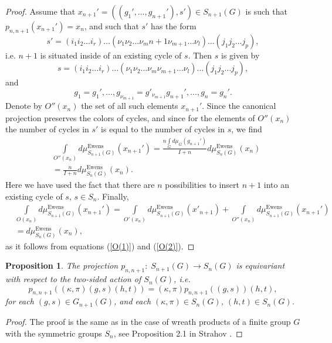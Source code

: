 \documentclass[12pt]{amsart}
\newtheorem{prop}[thm]{Proposition}
\theoremstyle{definition}
\numberwithin{equation}{section}
\DeclareMathOperator{\Ewens}{Ewens}
\begin{document}
\begin{proof}
Assume that
$x_{n+1}'=\left(\left(g_1',\ldots,g_{n+1}'\right),s'\right)\in S_{n+1}(G)$ is such that $p_{n,n+1}(x_{n+1}')=x_n$, and such that $s'$ has the form
\begin{equation}
s'=\left(i_1i_2\ldots i_r\right)\ldots\left(\nu_1\nu_2\ldots\nu_mn+1\nu_{m+1}\ldots\nu_l\right)\ldots\left(j_1j_2\ldots j_p\right),
\end{equation}
i.e. $n+1$ is situated inside of an existing cycle of $s$. Then $s$ is given by
\begin{equation}
s=\left(i_1i_2\ldots i_r\right)\ldots\left(\nu_1\nu_2\ldots\nu_m\nu_{m+1}\ldots\nu_l\right)\ldots\left(j_1j_2\ldots j_p\right),
\end{equation}
and
\begin{equation}
g_1=g_1',\ldots,g_{\nu_{m+1}}=g'_{\nu_{m+1}}g_{n+1}',\ldots,g_n=g_n'.
\end{equation}
Denote by $O''(x_n)$ the set of all such elements $x_{n+1}'$. Since the canonical projection preserves the colors of
cycles, and since for the elements of $O''(x_n)$ the number of cycles in $s'$ is equal to the number of cycles in $s$, we find
\begin{equation}\label{O(2)}
\begin{split}
&\int\limits_{O''(x_n)}d\mu^{\Ewens}_{S_{n+1}(G)}(x_{n+1}')=\frac{n\int\limits_{G}d\mu_{G}\left(g_{n+1}'\right)}
{I+n}d\mu_{S_n(G)}^{\Ewens}(x_n)\\
&=\frac{n}{I+n}d\mu_{S_n(G)}^{\Ewens}\left(x_n\right).
\end{split}
\end{equation}
Here we have used the fact that there are $n$ possibilities to insert $n+1$ into an existing cycle of $s$, $s\in S_{n}$. Finally,
\begin{equation}
\begin{split}
&\int\limits_{O(x_n)}d\mu^{\Ewens}_{S_{n+1}(G)}(x_{n+1}')=
\int\limits_{O'(x_n)}d\mu^{\Ewens}_{S_{n+1}(G)}(x'_{n+1})+\int\limits_{O''(x_n)}d\mu^{\Ewens}_{S_{n+1}(G)}(x_{n+1}')\\
&=d\mu_{S_n(G)}^{\Ewens}\left(x_n\right),
\end{split}
\end{equation}
as it follows from equations (\ref{O(1)}) and (\ref{O(2)}).
\end{proof}
\begin{prop} The projection $p_{n,n+1}:\; S_{n+1}\left(G\right)\longrightarrow S_n\left(G\right)$ is equivariant with respect to the two-sided action of $S_n\left(G\right)$, i.e.
$$
p_{n,n+1}\left((\kappa,\pi)(g,s)(h,t)\right)=(\kappa,\pi)p_{n,n+1}\left((g,s)\right)(h,t),
$$
for each $(g,s)\in G_{n+1}(G)$, and each $(\kappa,\pi)\in S_n(G)$, $(h,t)\in S_n(G)$.
\end{prop}
\begin{proof}
The proof is the same as in the case of wreath products of a finite group $G$ with the symmetric groups
$S_n$, see Proposition 2.1 in Strahov \cite{StrahovIsr25}.
\end{proof}
\end{document}
